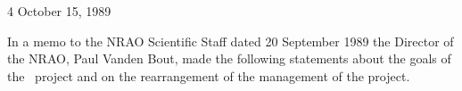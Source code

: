 

 {4} {October 15, 1989}


   In a memo to the NRAO Scientific Staff dated 20 September 1989 the
Director of the NRAO, Paul Vanden Bout, made the following statements
about the goals of the \AIPS\ project and on the rearrangement of the
management of the project.

